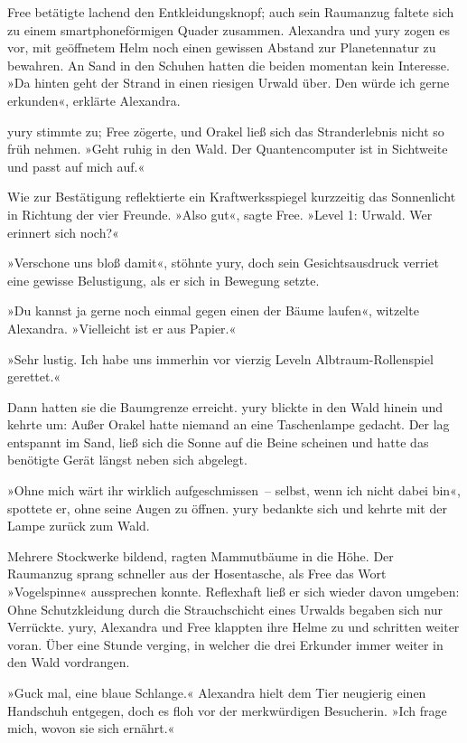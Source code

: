 Free betätigte lachend den Entkleidungsknopf; auch sein Raumanzug faltete sich zu einem smartphoneförmigen Quader zusammen. Alexandra und yury zogen es vor, mit geöffnetem Helm noch einen gewissen Abstand zur Planetennatur zu bewahren. An Sand in den Schuhen hatten die beiden momentan kein Interesse. »Da hinten geht der Strand in einen riesigen Urwald über. Den würde ich gerne erkunden«, erklärte Alexandra.

yury stimmte zu; Free zögerte, und Orakel ließ sich das Stranderlebnis nicht so früh nehmen. »Geht ruhig in den Wald. Der Quantencomputer ist in Sichtweite und passt auf mich auf.«

Wie zur Bestätigung reflektierte ein Kraftwerksspiegel kurzzeitig das Sonnenlicht in Richtung der vier Freunde. »Also gut«, sagte Free. »Level 1: Urwald. Wer erinnert sich noch?«

»Verschone uns bloß damit«, stöhnte yury, doch sein Gesichtsausdruck verriet eine gewisse Belustigung, als er sich in Bewegung setzte.

»Du kannst ja gerne noch einmal gegen einen der Bäume laufen«, witzelte Alexandra. »Vielleicht ist er aus Papier.«

»Sehr lustig. Ich habe uns immerhin vor vierzig Leveln Albtraum-Rollenspiel gerettet.«

Dann hatten sie die Baumgrenze erreicht. yury blickte in den Wald hinein und kehrte um: Außer Orakel hatte niemand an eine Taschenlampe gedacht. Der lag entspannt im Sand, ließ sich die Sonne auf die Beine scheinen und hatte das benötigte Gerät längst neben sich abgelegt.

»Ohne mich wärt ihr wirklich aufgeschmissen~– selbst, wenn ich nicht dabei bin«, spottete er, ohne seine Augen zu öffnen. yury bedankte sich und kehrte mit der Lampe zurück zum Wald.

Mehrere Stockwerke bildend, ragten Mammutbäume in die Höhe. Der Raumanzug sprang schneller aus der Hosentasche, als Free das Wort »Vogelspinne« aussprechen konnte. Reflexhaft ließ er sich wieder davon umgeben: Ohne Schutzkleidung durch die Strauchschicht eines Urwalds begaben sich nur Verrückte. yury, Alexandra und Free klappten ihre Helme zu und schritten weiter voran. Über eine Stunde verging, in welcher die drei Erkunder immer weiter in den Wald vordrangen.

»Guck mal, eine blaue Schlange.« Alexandra hielt dem Tier neugierig einen Handschuh entgegen, doch es floh vor der merkwürdigen Besucherin. »Ich frage mich, wovon sie sich ernährt.«

